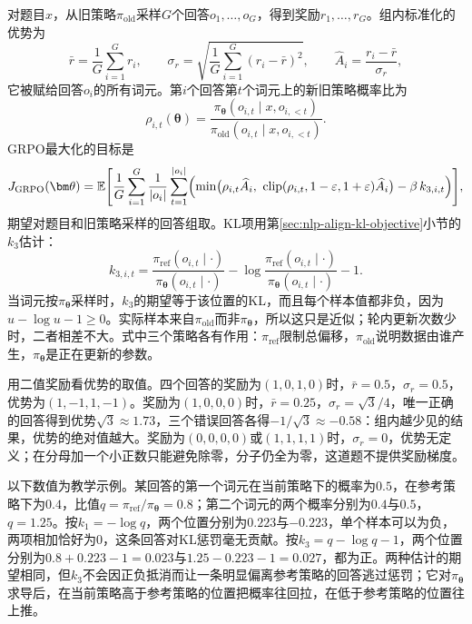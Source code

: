 对题目$x$，从旧策略$\pi_{\mathrm{old}}$采样$G$个回答$o_1,\ldots,o_G$，得到奖励$r_1,\ldots,r_G$。组内标准化的优势为
\begin{equation}
  \bar r=\frac1G\sum_{i=1}^{G}r_i,\qquad
  \sigma_r=\sqrt{\frac1G\sum_{i=1}^{G}(r_i-\bar r)^2},\qquad
  \widehat A_i=\frac{r_i-\bar r}{\sigma_r},
  \label{eq:nlp-reasoning-group-advantage}
\end{equation}
它被赋给回答$o_i$的所有词元。第$i$个回答第$t$个词元上的新旧策略概率比为
\begin{equation}
  \rho_{i,t}(\bm\theta)=
  \frac{\pi_{\bm\theta}(o_{i,t}\mid x,o_{i,<t})}{\pi_{\mathrm{old}}(o_{i,t}\mid x,o_{i,<t})}.
  \label{eq:nlp-reasoning-token-ratio}
\end{equation}
GRPO最大化的目标是
\begin{equation}
  J_{\mathrm{GRPO}}(\bm\theta)=\mathbb E\Biggl[\frac1G\sum_{i=1}^{G}\frac{1}{|o_i|}\sum_{t=1}^{|o_i|}
  \Bigl(\min\bigl(\rho_{i,t}\widehat A_i,\ \operatorname{clip}(\rho_{i,t},1-\varepsilon,1+\varepsilon)\widehat A_i\bigr)
  -\beta\,k_{3,i,t}\Bigr)\Biggr],
  \label{eq:nlp-reasoning-grpo-objective}
\end{equation}
期望对题目和旧策略采样的回答组取。KL项用第\ref{sec:nlp-align-kl-objective}小节的$k_3$估计：
\[
  k_{3,i,t}=\frac{\pi_{\mathrm{ref}}(o_{i,t}\mid\cdot)}{\pi_{\bm\theta}(o_{i,t}\mid\cdot)}
  -\log\frac{\pi_{\mathrm{ref}}(o_{i,t}\mid\cdot)}{\pi_{\bm\theta}(o_{i,t}\mid\cdot)}-1 .
\]
当词元按$\pi_{\bm\theta}$采样时，$k_3$的期望等于该位置的KL，而且每个样本值都非负，因为$u-\log u-1\ge0$。实际样本来自$\pi_{\mathrm{old}}$而非$\pi_{\bm\theta}$，所以这只是近似；轮内更新次数少时，二者相差不大。式中三个策略各有作用：$\pi_{\mathrm{ref}}$限制总偏移，$\pi_{\mathrm{old}}$说明数据由谁产生，$\pi_{\bm\theta}$是正在更新的参数。

用二值奖励看优势的取值。四个回答的奖励为$(1,0,1,0)$时，$\bar r=0.5$，$\sigma_r=0.5$，优势为$(1,-1,1,-1)$。奖励为$(1,0,0,0)$时，$\bar r=0.25$，$\sigma_r=\sqrt3/4$，唯一正确的回答得到优势$\sqrt3\approx1.73$，三个错误回答各得$-1/\sqrt3\approx-0.58$：组内越少见的结果，优势的绝对值越大。奖励为$(0,0,0,0)$或$(1,1,1,1)$时，$\sigma_r=0$，优势无定义；在分母加一个小正数只能避免除零，分子仍全为零，这道题不提供奖励梯度。

\begin{example}[两个词元上的$k_1$与$k_3$]
  \label{ex:nlp-reasoning-k3}
  以下数值为教学示例。某回答的第一个词元在当前策略下的概率为$0.5$，在参考策略下为$0.4$，比值$q=\pi_{\mathrm{ref}}/\pi_{\bm\theta}=0.8$；第二个词元的两个概率分别为$0.4$与$0.5$，$q=1.25$。按$k_1=-\log q$，两个位置分别为$0.223$与$-0.223$，单个样本可以为负，两项相加恰好为0，这条回答对KL惩罚毫无贡献。按$k_3=q-\log q-1$，两个位置分别为$0.8+0.223-1=0.023$与$1.25-0.223-1=0.027$，都为正。两种估计的期望相同，但$k_3$不会因正负抵消而让一条明显偏离参考策略的回答逃过惩罚；它对$\pi_{\bm\theta}$求导后，在当前策略高于参考策略的位置把概率往回拉，在低于参考策略的位置往上推。
\end{example}

